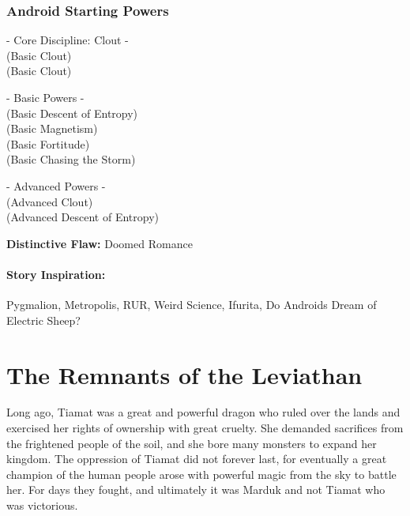 \subsubsection{Android Starting Powers}

\hspace{\parindent} - Core Discipline: Clout -\\
 (Basic Clout)\\
 (Basic Clout)

- Basic Powers -\\
 (Basic Descent of Entropy)\\
 (Basic Magnetism)\\
 (Basic Fortitude)\\
 (Basic Chasing the Storm)

- Advanced Powers -\\
 (Advanced Clout)\\
 (Advanced Descent of Entropy)

\textbf{Distinctive Flaw:} Doomed Romance

\paragraph{Story Inspiration:} Pygmalion, Metropolis, RUR, Weird Science, Ifurita, Do Androids Dream of Electric Sheep?

\section[Leviathan]{The Remnants of the Leviathan} 

Long ago, Tiamat was a great and powerful dragon who ruled over the lands and exercised her rights of ownership with great cruelty. She demanded sacrifices from the frightened people of the soil, and she bore many monsters to expand her kingdom. The oppression of Tiamat did not forever last, for eventually a great champion of the human people arose with powerful magic from the sky to battle her. For days they fought, and ultimately it was Marduk and not Tiamat who was victorious.

